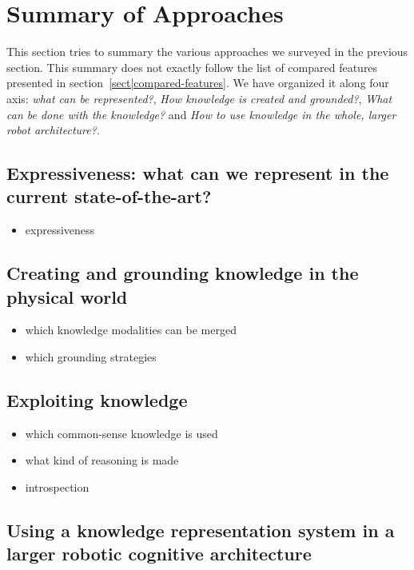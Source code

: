\documentclass[a4paper, twocolumn]{article}
\begin{document}
\section{Summary of Approaches}
\label{sect|summary}

This section tries to summary the various approaches we surveyed in the
previous section.  This summary does not exactly follow the list of compared
features presented in section~\ref{sect|compared-features}. We have organized
it along four axis: \emph{what can be represented?}, \emph{How knowledge is
created and grounded?}, \emph{What can be done with the knowledge?} and
\emph{How to use knowledge in the whole, larger robot architecture?}.

\subsection{Expressiveness: what can we represent in the current state-of-the-art?}
\label{sect|summary-expressiveness}

\begin{itemize}
	\item expressiveness
\end{itemize}


\subsection{Creating and grounding knowledge in the physical world}
\label{sect|summary-grounding}

\begin{itemize}
	\item which knowledge modalities can be merged
	\item which grounding strategies
\end{itemize}


\subsection{Exploiting knowledge}
\label{sect|summary-knowledge-sources-reasoning}

\begin{itemize}
	\item which common-sense knowledge is used
	\item what kind of reasoning is made
	\item introspection
\end{itemize}


\subsection{Using a knowledge representation system in a larger robotic cognitive architecture}
\label{sect|summary-integration}
\end{document}
